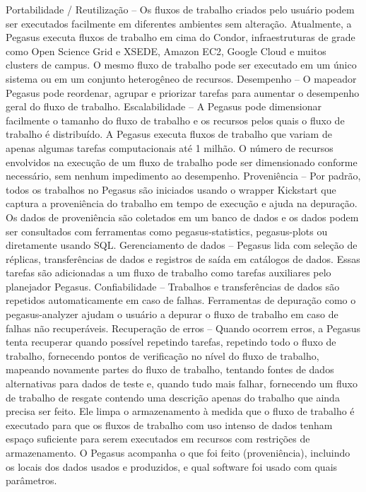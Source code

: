 \documentclass[tese,capa]{texufpel}
\begin{document}
Portabilidade / Reutilização – Os fluxos de trabalho criados pelo usuário podem ser executados facilmente em diferentes ambientes sem alteração. Atualmente, a Pegasus executa fluxos de trabalho em cima do Condor, infraestruturas de grade como Open Science Grid e XSEDE, Amazon EC2, Google Cloud e muitos clusters de campus. O mesmo fluxo de trabalho pode ser executado em um único sistema ou em um conjunto heterogêneo de recursos.
Desempenho – O mapeador Pegasus pode reordenar, agrupar e priorizar tarefas para aumentar o desempenho geral do fluxo de trabalho.
Escalabilidade – A Pegasus pode dimensionar facilmente o tamanho do fluxo de trabalho e os recursos pelos quais o fluxo de trabalho é distribuído. A Pegasus executa fluxos de trabalho que variam de apenas algumas tarefas computacionais até 1 milhão. O número de recursos envolvidos na execução de um fluxo de trabalho pode ser dimensionado conforme necessário, sem nenhum impedimento ao desempenho.
Proveniência – Por padrão, todos os trabalhos no Pegasus são iniciados usando o wrapper Kickstart que captura a proveniência do trabalho em tempo de execução e ajuda na depuração. Os dados de proveniência são coletados em um banco de dados e os dados podem ser consultados com ferramentas como pegasus-statistics, pegasus-plots ou diretamente usando SQL.
Gerenciamento de dados – Pegasus lida com seleção de réplicas, transferências de dados e registros de saída em catálogos de dados. Essas tarefas são adicionadas a um fluxo de trabalho como tarefas auxiliares pelo planejador Pegasus.
Confiabilidade – Trabalhos e transferências de dados são repetidos automaticamente em caso de falhas. Ferramentas de depuração como o pegasus-analyzer ajudam o usuário a depurar o fluxo de trabalho em caso de falhas não recuperáveis.
Recuperação de erros – Quando ocorrem erros, a Pegasus tenta recuperar quando possível repetindo tarefas, repetindo todo o fluxo de trabalho, fornecendo pontos de verificação no nível do fluxo de trabalho, mapeando novamente partes do fluxo de trabalho, tentando fontes de dados alternativas para dados de teste e, quando tudo mais falhar, fornecendo um fluxo de trabalho de resgate contendo uma descrição apenas do trabalho que ainda precisa ser feito. Ele limpa o armazenamento à medida que o fluxo de trabalho é executado para que os fluxos de trabalho com uso intenso de dados tenham espaço suficiente para serem executados em recursos com restrições de armazenamento. O Pegasus acompanha o que foi feito (proveniência), incluindo os locais dos dados usados e produzidos, e qual software foi usado com quais parâmetros.
\end{document}

